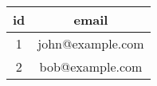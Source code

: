 \begin{tabular}{|c|c|}
    \hline
        \textbf{id} & \textbf{email} \\ \hline
        1 & john@example.com \\ 
        2 & bob@example.com \\ \hline
\end{tabular}
